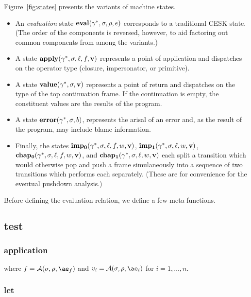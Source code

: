 Figure~\ref{fig:states} presents the variants of machine states.
\begin{itemize}
\item An \emph{evaluation} state $\mathbf{eval}(\gamma^*,\sigma,\rho,e)$ corresponds to a traditional CESK state.
(The order of the components is reversed, however, to aid factoring out common components from among the variants.)


\item A state $\mathbf{apply}(\gamma^*,\sigma,\ell,f,\mathbf{v})$ represents a point of application and dispatches on the operator type (closure, impersonator, or primitive).
\item A state $\mathbf{value}(\gamma^*,\sigma,\mathbf{v})$ represents a point of return and dispatches on the type of the top continuation frame.
If the continuation is empty, the constituent values are the results of the program.
\item A state $\mathbf{error}(\gamma^*,\sigma,b)$, represents the arisal of an error and, as the result of the program, may include blame information.
\item Finally, the states $\mathbf{imp_0}(\gamma^*,\sigma,\ell,f,w,\mathbf{v})$, $\mathbf{imp_1}(\gamma^*,\sigma,\ell,w,\mathbf{v})$, $\mathbf{chap_0}(\gamma^*,\sigma,\ell,f,w,\mathbf{v})$, and $\mathbf{chap_1}(\gamma^*,\sigma,\ell,w,\mathbf{v})$ each split a transition which would otherwise pop and push a frame simulaneously into a sequence of two transitions which performs each separately.
(These are for convenience for the eventual pushdown analysis.)
\end{itemize}

Before defining the evaluation relation, we define a few meta-functions.

\subsection{test}

\subsubsection{application}

\noindent
{}

\noindent
where $f=\A{\sigma}{\rho}{\ae_f}$ and $v_i=\A{\sigma}{\rho}{\ae_i}$ for $i=1,\dots,n$.

\subsubsection{let}

